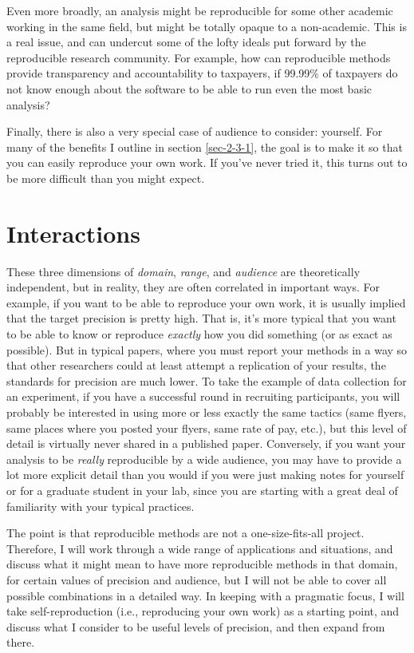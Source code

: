 \documentclass{book}
\begin{document}
Even more broadly, an analysis might be reproducible for some other academic working in the same field, but might be totally opaque to a non-academic.  This is a real issue, and can undercut some of the lofty ideals put forward by the reproducible research community.  For example, how can reproducible methods provide transparency and accountability to taxpayers, if 99.99\% of taxpayers do not know enough about the software to be able to run even the most basic analysis?

Finally, there is also a very special case of audience to consider: yourself.  For many of the benefits I outline in section \ref{sec-2-3-1}, the goal is to make it so that you can easily reproduce your own work.  If you've never tried it, this turns out to be more difficult than you might expect.
\section{Interactions}
\label{sec-3-4}

These three dimensions of \emph{domain}, \emph{range}, and \emph{audience} are theoretically independent, but in reality, they are often correlated in important ways.  For example, if you want to be able to reproduce your own work, it is usually implied that the target precision is pretty high. That is, it's more typical that you want to be able to know or reproduce \emph{exactly} how you did something (or as exact as possible).  But in typical papers, where you must report your methods in a way so that other researchers could at least attempt a replication of your results, the standards for precision are much lower. To take the example of data collection for an experiment, if you have a successful round in recruiting participants, you will probably be interested in using more or less exactly the same tactics (same flyers, same places where you posted your flyers, same rate of pay, etc.), but this level of detail is virtually never shared in a published paper.  Conversely, if you want your analysis to be \emph{really} reproducible by a wide audience, you may have to provide a lot more explicit detail than you would if you were just making notes for yourself or for a graduate student in your lab, since you are starting with a great deal of familiarity with your typical practices. 

The point is that reproducible methods are not a one-size-fits-all project. Therefore, I will work through a wide range of applications and situations, and discuss what it might mean to have more reproducible methods in that domain, for certain values of precision and audience, but I will not be able to cover all possible combinations in a detailed way. In keeping with a pragmatic focus, I will take self-reproduction (i.e., reproducing your own work) as a starting point, and discuss what I consider to be useful levels of precision, and then expand from there. 
\end{document}
